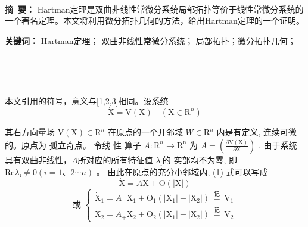\documentclass[12pt,a4paper,UTF8]{ctexart}
\begin{document}

\begin{center}
  \LARGE{}\par
  \par
\end{center}
\begin{spacing}{0.7}
	~
\end{spacing}
\noindent \textbf{摘~要：} Hartman定理是双曲非线性常微分系统局部拓扑等价于线性常微分系统的一个著名定理。本文将利用微分拓扑几何的方法，给出Hartman定理的一个证明。

\noindent \textbf{关键词：} Hartman定理；  双曲非线性常微分系统； 局部拓扑；微分拓扑几何；
\begin{spacing}{1.3}
	~
\end{spacing} 



\begin{spacing}{0.8}
	~
\end{spacing}
本文引用的符号，意义与[1,2,3]相同。设系统
\begin{equation}
	\dot{\mathrm{X}}=\mathrm{V}(\mathrm{X}) \quad\left(\mathrm{X} \in \mathrm{R}^{n}\right)
\end{equation}

其右方向量场 $ \mathrm{V}(\mathrm{X}) \in \mathrm{R}^{n} $ 在原点的一个开邻域 $ W \in \mathrm{R}^{n} $ 内是有定义, 连续可微的。原点为 孤立奇点。
令线 性 算子 $ A: \mathrm{R}^{n} \rightarrow \mathrm{R}^{\mathrm{n}}$  为 $ A=\left(\frac{\partial \mathrm{V}(\mathrm{X})}{\partial \mathrm{X}}\right)$ . 
由于系统具有双曲非线性，$  A  $所对应的所有特征值 $ \lambda_{\mathrm{i}}  $的 实部均不为零, 即 $ \mathrm{R e} \lambda_{\mathrm{i}} \neq 0(i=1 、 2 \cdots n) $ 。
由此在原点的充分小邻域内, (1) 式可以写成  
$$\dot{\mathrm{X}}=A \mathrm{X}+\mathrm{O}(|\mathrm{X}|)$$
\begin{equation}
\text{或  }  \left\{\begin{array}{l}\dot{\mathrm{X}}_{1}=A_{-} \mathrm{X}_{1}+\mathrm{O}_{1}\left(\left|\mathrm{X}_{1}\right|+\left|\mathrm{X}_{2}\right|\right) \stackrel{\text { 记 }}{=} \mathrm{V}_{1} \\ \dot{\mathrm{X}}_{2}=A_{+} \mathrm{X}_{2}+\mathrm{O}_{2}\left(\left|\mathrm{X}_{1}\right|+\left|\mathrm{X}_{2}\right|\right) \stackrel{\text { 记 }}{=} \mathrm{V}_{2}\end{array}\right. 
\end{equation}
\end{document}
